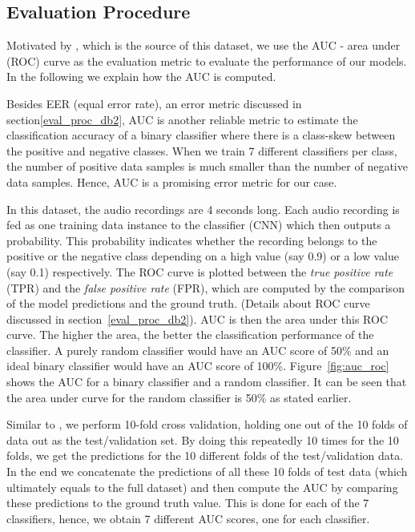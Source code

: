 \subsection{Evaluation Procedure}
Motivated by \cite{foster2015chime}, which is the source of this dataset, we use the AUC - area under (ROC) curve as the evaluation metric to evaluate the performance of our models. In the following we explain how the AUC is computed.

Besides EER (equal error rate), an error metric discussed in section\ref{eval_proc_db2}, AUC is another reliable metric to estimate the classification accuracy of a binary classifier where there is a class-skew between the positive and negative classes. When we train 7 different classifiers per class, the number of positive data samples is much smaller than the number of negative data samples. Hence, AUC is a promising error metric for our case.

In this dataset, the audio recordings are 4 seconds long. Each audio recording is fed as one training data instance to the classifier (CNN) which then outputs a probability. This probability indicates whether the recording belongs to the positive or the negative class depending on a high value (say 0.9) or a low value (say 0.1) respectively. The ROC curve is plotted between the \textsl{true positive rate} (TPR) and the \textsl{false positive rate} (FPR), which are computed by the comparison of the model predictions and the ground truth. (Details about ROC curve discussed in section~\ref{eval_proc_db2}). AUC is then the area under this ROC curve. The higher the area, the better the classification performance of the classifier. A purely random classifier would have an AUC score of 50\% and an ideal binary classifier would have an AUC score of 100\%. Figure~\ref{fig:auc_roc} shows the AUC for a binary classifier and a random classifier. It can be seen that the area under curve for the random classifier is 50\% as stated earlier.

Similar to \cite{foster2015chime}, we perform 10-fold cross validation, holding one out of the 10 folds of data out as the test/validation set. By doing this repeatedly 10 times for the 10 folds, we get the predictions for the 10 different folds of the test/validation data. In the end we concatenate the predictions of all these 10 folds of test data (which ultimately equals to the full dataset) and then compute the AUC by comparing these predictions to the ground truth value. This is done for each of the 7 classifiers, hence, we obtain 7 different AUC scores, one for each classifier.

